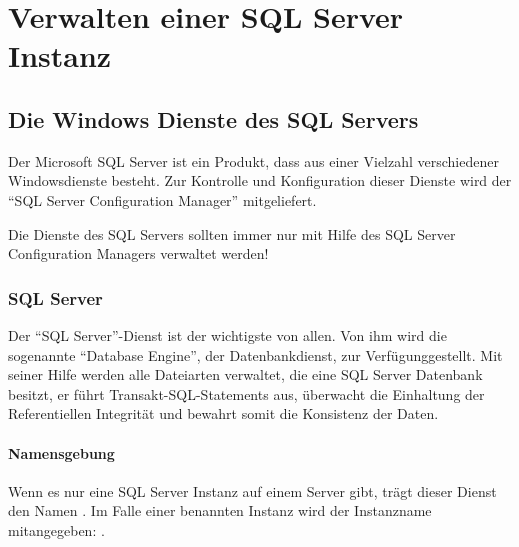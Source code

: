   \chapter{Verwalten einer SQL Server Instanz}
    \setcounter{page}{1}
    \minitoc
\newpage

    \section{Die Windows Dienste des SQL Servers}
      Der Microsoft SQL Server ist ein Produkt, dass aus einer Vielzahl
      verschiedener Windowsdienste besteht. Zur Kontrolle und Konfiguration dieser
      Dienste wird der \enquote{SQL Server Configuration Manager} mitgeliefert.
      \begin{merke}
        Die Dienste des SQL Servers sollten immer nur mit Hilfe des SQL Server
        Configuration Managers verwaltet werden!
      \end{merke}
      \subsection{SQL Server}
        Der \enquote{SQL Server}-Dienst ist der wichtigste von allen. Von ihm
        wird die sogenannte \enquote{Database Engine}, der
        Datenbankdienst, zur Verfügunggestellt. Mit seiner Hilfe werden alle
        Dateiarten verwaltet, die eine SQL Server Datenbank besitzt, er führt
        Transakt-SQL-Statements aus, überwacht die Einhaltung der Referentiellen
        Integrität und bewahrt somit die Konsistenz der Daten.
        \subsubsection{Namensgebung}
          Wenn es nur eine SQL Server Instanz auf einem Server gibt, trägt dieser
          Dienst den Namen . Im Falle einer
          benannten Instanz wird der Instanzname mitangegeben: .
